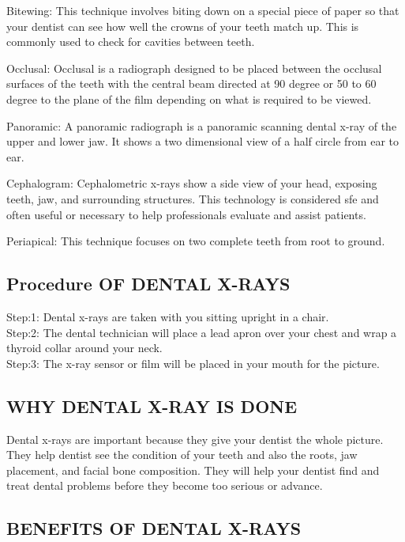 \documentclass[12pt]{article}
\begin{document}
\begin{itemize}
{\large \item Bitewing: This technique involves biting down on a special piece of paper so that your dentist can see how well the crowns of your teeth match up. This is commonly used to check for cavities between teeth.
\item Occlusal: Occlusal is a radiograph designed to be placed between the occlusal surfaces of the teeth with the central beam directed at 90 degree or 50 to 60 degree to the plane of the film depending on what is required to be viewed. 
\item Panoramic: A panoramic radiograph is a panoramic scanning dental x-ray of the upper and lower jaw. It shows a two dimensional view of a half circle from ear to ear.
\item Cephalogram: Cephalometric x-rays show a side view of your head, exposing teeth, jaw, and surrounding structures. This technology is considered sfe and often useful or necessary to help professionals evaluate and assist patients.
\item Periapical: This technique focuses on two complete teeth from root to ground.}
\end{itemize}

\subsection{Procedure OF DENTAL X-RAYS}

{\large Step:1: Dental x-rays are taken with you sitting upright in a chair.\\
Step:2: The dental technician will place a lead apron over your chest and wrap a thyroid collar around your neck.\\Step:3: The x-ray sensor or film will be placed in your mouth for the picture.}


\subsection{WHY DENTAL X-RAY IS DONE}

{\large Dental x-rays are important because they give your dentist the whole picture. They help dentist see the condition of your teeth and also the roots, jaw placement, and facial bone composition. They will help your dentist find and treat dental problems before they become too serious or advance.}


\subsection{BENEFITS OF DENTAL X-RAYS}
\end{document}
